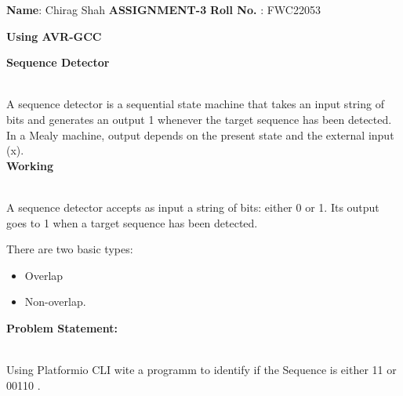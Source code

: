 \documentclass[10pt,a4paper]{report}
\begin{document}
\raggedright \textbf{Name}:\hspace{1mm} Chirag Shah\hspace{3cm} \Large \textbf{ASSIGNMENT-3}\hspace{2.5cm} %
\normalsize \textbf{Roll No.} :\hspace{1mm} FWC22053\vspace{1mm}
\begin{center}
\textbf{Using AVR-GCC}\hspace{1cm}   \vspace{1cm}
\end{center}
\begin{multicols}{2}


\textbf{Sequence Detector}
\vspace{0.5cm}\raggedright \\A sequence detector is a sequential state machine that takes an input string of bits and generates an output 1 whenever the target sequence has been detected. In a Mealy machine, output depends on the present state and the external input (x).\vspace{3mm} \\ 
\textbf{Working}\vspace{1mm}
\raggedright \\A sequence detector accepts as input a string of bits: either 0 or 1. Its output goes to 1 when a target sequence has been detected.\vspace{3mm} \\ 
\raggedright There are two basic types:\vspace{3mm} 
\begin{itemize}
\item Overlap
\item Non-overlap. \vspace{2mm}
\end{itemize}
\raggedright \textbf{Problem Statement:}\vspace{2mm}
\raggedright \\Using Platformio CLI wite a programm to identify if the Sequence is either  11 or 00110 .

\vspace{5mm}


\end{multicols}
\end{document}
